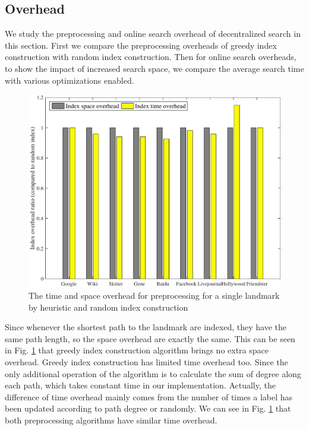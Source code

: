 \subsection{Overhead}
\label{eval_overhead}

We study the preprocessing and online search overhead of decentralized search in this section. First we compare the preprocessing overheads of greedy index construction with random index construction. Then for online search overheads, to show the impact of increased search space, we compare the average search time with various optimizations enabled. 

\begin{figure}[t]
    \centering
    \includegraphics[width=\linewidth]{./figures/overhead_index.pdf}
    \caption{The time and space overhead for preprocessing for a single landmark by heuristic and random index construction}
    \label{fig:overhead_index}
\end{figure}

Since whenever the shortest path to the landmark are indexed, they have the same path length, so the space overhead are exactly the same. This can be seen in Fig. \ref{fig:overhead_index} that greedy index construction algorithm brings no extra space overhead. Greedy index construction has limited time overhead too. Since the only additional operation of the algorithm is to calculate the sum of degree along each path, which takes constant time in our implementation. Actually, the difference of time overhead mainly comes from the number of times a label has been updated according to path degree or randomly. We can see in Fig. \ref{fig:overhead_index} that both preprocessing algorithms have similar time overhead.

